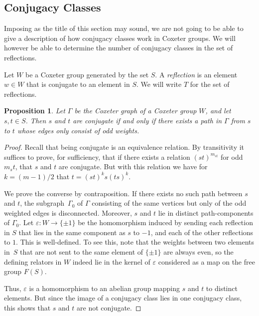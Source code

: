 \documentclass{article}
\newtheorem{proposition}[theorem]{Proposition}
\theoremstyle{definition}
\begin{document}
\subsection{Conjugacy Classes}\label{subsec:conjugacy-classes}
Imposing as the title of this section may sound, we are not going to be able to give a description of how conjugacy classes work in Coxeter groups. We will however be able to determine the number of conjugacy classes in the set of reflections.

Let $W$ be a Coxeter group generated by the set $S$. A \textit{reflection} is an element $w \in W$ that is conjugate to an element in $S$. We will write $T$ for the set of reflections.

\begin{proposition}\label{prop:conjugacy}
Let $\Gamma$ be the Coxeter graph of a Coxeter group $W$, and let $s, t \in S$. Then $s$ and $t$ are conjugate if and only if there exists a path in $\Gamma$ from $s$ to $t$ whose edges only consist of odd weights.
\end{proposition}

\begin{proof}
Recall that being conjugate is an equivalence relation. By transitivity it suffices to prove, for sufficiency, that if there exists a relation $(st)^{m_{st}}$ for odd $m_st$, that $s$ and $t$ are conjugate. But with this relation we have for $k = (m-1)/2$ that $t = (st)^ks(ts)^k$.

We prove the converse by contraposition. If there exists no such path between $s$ and $t$, the subgraph~$\Gamma_0$ of $\Gamma$ consisting of the same vertices but only of the odd weighted edges is disconnected. Moreover, $s$ and $t$ lie in distinct path-components of $\Gamma_0$. Let $\varepsilon: W \rightarrow \{\pm1\}$ be the homomorphism induced by sending each reflection in $S$ that lies in the same component as $s$ to $-1$, and each of the other reflections to $1$. This is well-defined. To see this, note that the weights between two elements in~$S$ that are not sent to the same element of $\{\pm1\}$ are always even, so the defining relators in $W$ indeed lie in the kernel of $\varepsilon$ considered as a map on the free group $F(S)$.

Thus, $\varepsilon$ is a homomorphism to an abelian group mapping $s$ and $t$ to distinct elements. But since the image of a conjugacy class lies in one conjugacy class, this shows that $s$ and $t$ are not conjugate.
\end{proof}
\end{document}
